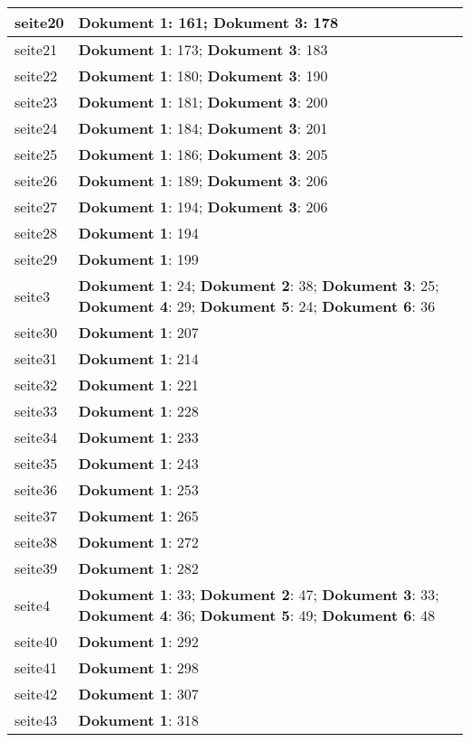 \documentclass[a5paper]{article}
\begin{document}
\begin{longtable}[l]{|l|p{3in}|}
\hline
seite20 & \textbf{Dokument 1}: 161; \textbf{Dokument 3}: 178 \\
\hline
seite21 & \textbf{Dokument 1}: 173; \textbf{Dokument 3}: 183 \\
\hline
seite22 & \textbf{Dokument 1}: 180; \textbf{Dokument 3}: 190 \\
\hline
seite23 & \textbf{Dokument 1}: 181; \textbf{Dokument 3}: 200 \\
\hline
seite24 & \textbf{Dokument 1}: 184; \textbf{Dokument 3}: 201 \\
\hline
seite25 & \textbf{Dokument 1}: 186; \textbf{Dokument 3}: 205 \\
\hline
seite26 & \textbf{Dokument 1}: 189; \textbf{Dokument 3}: 206 \\
\hline
seite27 & \textbf{Dokument 1}: 194; \textbf{Dokument 3}: 206 \\
\hline
seite28 & \textbf{Dokument 1}: 194 \\
\hline
seite29 & \textbf{Dokument 1}: 199 \\
\hline
seite3 & \textbf{Dokument 1}: 24; \textbf{Dokument 2}: 38; \textbf{Dokument 3}: 25; \textbf{Dokument 4}: 29; \textbf{Dokument 5}: 24; \textbf{Dokument 6}: 36 \\
\hline
seite30 & \textbf{Dokument 1}: 207 \\
\hline
seite31 & \textbf{Dokument 1}: 214 \\
\hline
seite32 & \textbf{Dokument 1}: 221 \\
\hline
seite33 & \textbf{Dokument 1}: 228 \\
\hline
seite34 & \textbf{Dokument 1}: 233 \\
\hline
seite35 & \textbf{Dokument 1}: 243 \\
\hline
seite36 & \textbf{Dokument 1}: 253 \\
\hline
seite37 & \textbf{Dokument 1}: 265 \\
\hline
seite38 & \textbf{Dokument 1}: 272 \\
\hline
seite39 & \textbf{Dokument 1}: 282 \\
\hline
seite4 & \textbf{Dokument 1}: 33; \textbf{Dokument 2}: 47; \textbf{Dokument 3}: 33; \textbf{Dokument 4}: 36; \textbf{Dokument 5}: 49; \textbf{Dokument 6}: 48 \\
\hline
seite40 & \textbf{Dokument 1}: 292 \\
\hline
seite41 & \textbf{Dokument 1}: 298 \\
\hline
seite42 & \textbf{Dokument 1}: 307 \\
\hline
seite43 & \textbf{Dokument 1}: 318 \\

\end{longtable}
\end{document}
